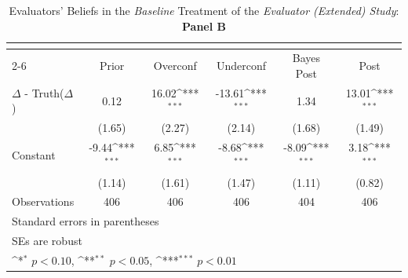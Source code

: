 \begin{table}[htbp]\centering
\def\sym#1{\ifmmode^{#1}\else\(^{#1}\)\fi}
\caption{Evaluators' Beliefs in the \textit{Baseline} Treatment of the \textit{Evaluator (Extended) Study}: \textbf{Panel B}}
\begin{tabular}{l*{5}{c}}
\hline\hline
                &\multicolumn{5}{c}{}                                                                          \\\cmidrule(lr){2-6}
                &\multicolumn{1}{c}{Prior}&\multicolumn{1}{c}{Overconf}&\multicolumn{1}{c}{Underconf}&\multicolumn{1}{c}{Bayes Post}&\multicolumn{1}{c}{Post}\\
\hline
$\Delta$ - Truth($\Delta$)&     0.12         &    16.02\sym{***}&   -13.61\sym{***}&     1.34         &    13.01\sym{***}\\
                &   (1.65)         &   (2.27)         &   (2.14)         &   (1.68)         &   (1.49)         \\
Constant        &    -9.44\sym{***}&     6.85\sym{***}&    -8.68\sym{***}&    -8.09\sym{***}&     3.18\sym{***}\\
                &   (1.14)         &   (1.61)         &   (1.47)         &   (1.11)         &   (0.82)         \\
\hline
Observations    &      406         &      406         &      406         &      404         &      406         \\
\hline\hline
\multicolumn{6}{l}{\footnotesize Standard errors in parentheses}\\
\multicolumn{6}{l}{\footnotesize SEs are robust}\\
\multicolumn{6}{l}{\footnotesize \sym{*} \(p<0.10\), \sym{**} \(p<0.05\), \sym{***} \(p<0.01\)}\\
\end{tabular}
\end{table}
